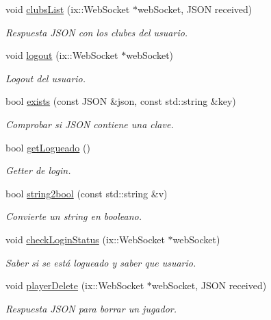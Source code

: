 \begin{DoxyCompactItemize}
void \mbox{\hyperlink{classapp_aacb1fe686708ce187073676232491baf}{clubs\+List}} (ix\+::\+Web\+Socket $\ast$web\+Socket, J\+S\+ON received)
\begin{DoxyCompactList}\small\item\em Respuesta J\+S\+ON con los clubes del usuario. \end{DoxyCompactList}\item 
void \mbox{\hyperlink{classapp_a93176ba428640e16ea767d95319ce0c2}{logout}} (ix\+::\+Web\+Socket $\ast$web\+Socket)
\begin{DoxyCompactList}\small\item\em Logout del usuario. \end{DoxyCompactList}\item 
bool \mbox{\hyperlink{classapp_a42e2a44d3325daf63b3ec57b8921d1b5}{exists}} (const J\+S\+ON \&json, const std\+::string \&key)
\begin{DoxyCompactList}\small\item\em Comprobar si J\+S\+ON contiene una clave. \end{DoxyCompactList}\item 
bool \mbox{\hyperlink{classapp_a9d5d32bf19b4ae0a9c9d7fab8d87ac0f}{get\+Logueado}} ()
\begin{DoxyCompactList}\small\item\em Getter de login. \end{DoxyCompactList}\item 
bool \mbox{\hyperlink{classapp_af87506f90057b288a801f2a0d4c00ef4}{string2bool}} (const std\+::string \&v)
\begin{DoxyCompactList}\small\item\em Convierte un string en booleano. \end{DoxyCompactList}\item 
void \mbox{\hyperlink{classapp_a77a1d0cb7a5a4982bcd618a5380e6edf}{check\+Login\+Status}} (ix\+::\+Web\+Socket $\ast$web\+Socket)
\begin{DoxyCompactList}\small\item\em Saber si se está logueado y saber que usuario. \end{DoxyCompactList}\item 
void \mbox{\hyperlink{classapp_a0c9c869259ac2e2362fd84e9a043395f}{player\+Delete}} (ix\+::\+Web\+Socket $\ast$web\+Socket, J\+S\+ON received)
\begin{DoxyCompactList}\small\item\em Respuesta J\+S\+ON para borrar un jugador. \end{DoxyCompactList}\end{DoxyCompactItemize}

